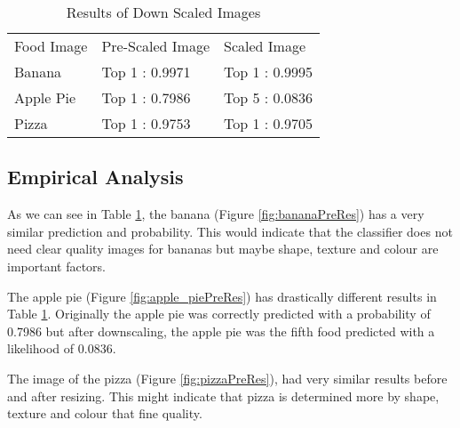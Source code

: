 \begin{table}[]
\centering
\caption{Results of Down Scaled Images}
\label{scaledImages}
\begin{tabular}{lll}
Food Image & Pre-Scaled Image & Scaled Image   \\
Banana     & Top 1 : 0.9971   & Top 1 : 0.9995 \\
Apple Pie  & Top 1 : 0.7986   & Top 5 : 0.0836 \\
Pizza      & Top 1 : 0.9753   & Top 1 : 0.9705
\end{tabular}
\end{table}

\subsection*{Empirical Analysis}
As we can see in Table \ref{scaledImages}, the banana (Figure \ref{fig:bananaPreRes}) has a very similar prediction and probability.
This would indicate that the classifier does not need clear quality images for bananas but maybe shape, texture and colour are important factors.

The apple pie (Figure \ref{fig:apple_piePreRes}) has drastically different results in Table \ref{scaledImages}.
Originally the apple pie was correctly predicted with a probability of 0.7986 but after downscaling, the apple pie was the fifth food predicted with a likelihood of 0.0836.

The image of the pizza (Figure \ref{fig:pizzaPreRes}), had very similar results before and after resizing.
This might indicate that pizza is determined more by shape, texture and colour that fine quality.


